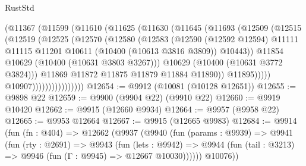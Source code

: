 \begin{lexlean}{RustStd}
\begin{coremodule}
                            (@11367
                              (@11599
                                (@11610
                                  (@11625
                                    (@11630
                                      (@11645
                                        (@11693
                                          (@12509
                                            (@12515
                                              (@12519
                                                (@12525
                                                  (@12570
                                                    (@12580
                                                      (@12583
                                                        (@12590
                                                          (@12592 @12594)
                                                          @11111
                                                          @11115
                                                          @11201
                                                          @10611
                                                          (@10400 (@10613 @3816 @3809))
                                                          @10443))
                                                      @11854
                                                      @10629
                                                      (@10400 (@10631 @3803 @3267)))
                                                    @10629
                                                    (@10400 (@10631 @3772 @3824)))
                                                  @11869
                                                  @11872
                                                  @11875
                                                  @11879
                                                  @11884
                                                  @11890))
                                              @11895)))))
                                    @10907))))))))))))))))
@12654 := @9912 (@10081 (@10128 @12651))
@12655 := @9898 @22
@12659 := @9900 (@9904 @22) (@9910 @22)
@12660 := @9919 @10420
@12662 := @9915 (@12660 @9934)
@12664 := @9957 (@9958 @22)
@12665 := @9953 @12664
@12667 := @9915 (@12665 @9983)
@12684 := @9914
    (fun (fn : @404) =>
    @12662
      (@9937
        (@9940
          (fun (params : @9939) =>
          @9941
            (fun (rty : @2691) =>
            @9943
              (fun (lets : @9942) =>
              @9944 (fun (tail : @3213) => @9946 (fun (Γ : @9945) => @12667 @10030))))))
        @10076))

\end{coremodule}
\end{lexlean}
